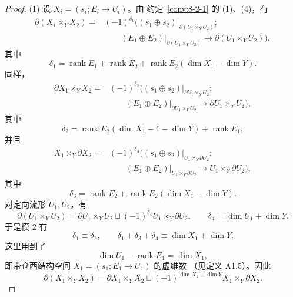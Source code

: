 \begin{proof}
\textup{(1)} 设 $X_i=(s_i;E_i\to U_i)$。由
约定~\ref{conv:8-2-1} 的 (1)、(4)，有
\[
\begin{aligned}
 \partial(X_1\times_YX_2)
 ={}&(-1)^{\delta_1}
 \bigl((s_1\oplus s_2)|_{\partial(U_1\times_YU_2)};\\
 &\qquad (E_1\oplus E_2)|_{\partial(U_1\times_YU_2)}
 \longrightarrow\partial(U_1\times_YU_2)\bigr),
\end{aligned}
\]
其中
\[
 \delta_1=\operatorname{rank}E_1+\operatorname{rank}E_2
 +\operatorname{rank}E_2(\dim X_1-\dim Y).
\]
同样，
\[
\begin{aligned}
 \partial X_1\times_YX_2
 ={}&(-1)^{\delta_2}
 \bigl((s_1\oplus s_2)|_{\partial U_1\times_YU_2};\\
 &\qquad (E_1\oplus E_2)|_{\partial U_1\times_YU_2}
 \longrightarrow\partial U_1\times_YU_2\bigr),
\end{aligned}
\]
其中
\[
 \delta_2=\operatorname{rank}E_2(\dim X_1-1-\dim Y)
 +\operatorname{rank}E_1,
\]
并且
\[
\begin{aligned}
 X_1\times_Y\partial X_2
 ={}&(-1)^{\delta_3}
 \bigl((s_1\oplus s_2)|_{U_1\times_Y\partial U_2};\\
 &\qquad (E_1\oplus E_2)|_{U_1\times_Y\partial U_2}
 \longrightarrow U_1\times_Y\partial U_2\bigr),
\end{aligned}
\]
其中
\[
 \delta_3=\operatorname{rank}E_2
 +\operatorname{rank}E_2(\dim X_1-\dim Y).
\]
对定向流形 $U_1,U_2$，有
\[
 \partial(U_1\times_YU_2)
 =\partial U_1\times_YU_2
 \mathbin{\sqcup}(-1)^{\delta_4}U_1\times_Y\partial U_2,
 \qquad \delta_4=\dim U_1+\dim Y.
\]
于是模 $2$ 有
\[
 \delta_1\equiv\delta_2,
 \qquad
 \delta_1+\delta_3+\delta_4\equiv\dim X_1+\dim Y.
\]
这里用到了
\[
 \dim U_1-\operatorname{rank}E_1=\dim X_1,
\]
即带仓西结构空间 $X_1=(s_1;E_1\to U_1)$ 的虚维数
（见定义 A1.5）。因此
\[
 \partial(X_1\times_YX_2)
 =\partial X_1\times_YX_2
 \mathbin{\sqcup}(-1)^{\dim X_1+\dim Y}
 X_1\times_Y\partial X_2.
\]


\end{proof}
